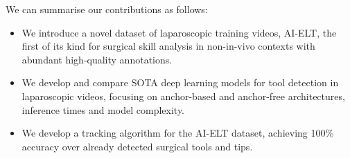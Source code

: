 We can summarise our contributions as follows:

\begin{itemize}[noitemsep, left=0pt]
\item We introduce a novel dataset of laparoscopic training videos, AI-ELT, the first of its kind for surgical skill analysis in non-in-vivo contexts with abundant high-quality annotations.
\item We develop and compare SOTA deep learning models for tool detection in laparoscopic videos, focusing on anchor-based and anchor-free architectures, inference times and model complexity.
\item We develop a tracking algorithm for the AI-ELT dataset, achieving 100\% accuracy over already detected surgical tools and tips.
\end{itemize}

